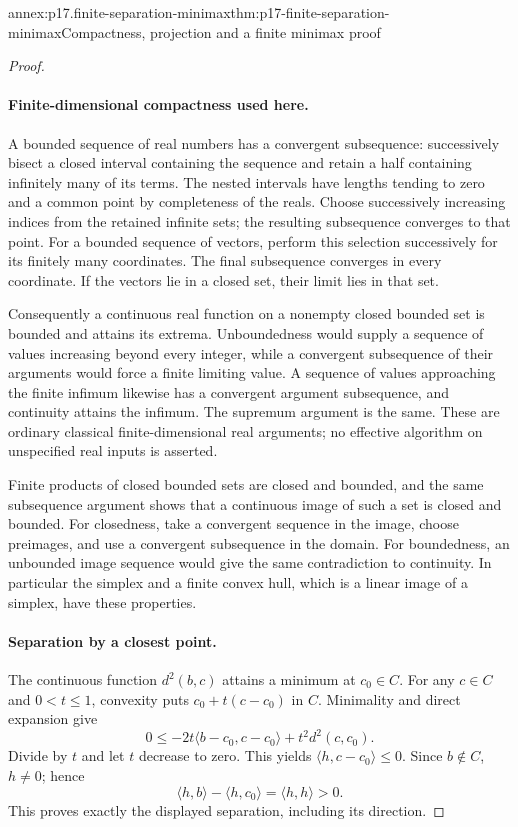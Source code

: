 \begin{annexitem}{annex:p17.finite-separation-minimax}{thm:p17-finite-separation-minimax}{Compactness, projection and a finite minimax proof}
\begin{proof}
\paragraph{Finite-dimensional compactness used here.}
A bounded sequence of real numbers has a convergent subsequence:
successively bisect a closed interval containing the sequence and retain
a half containing infinitely many of its terms. The nested intervals
have lengths tending to zero and a common point by completeness of the
reals. Choose successively increasing indices from the retained infinite
sets; the resulting subsequence converges to that point.
For a bounded sequence of vectors, perform this selection successively
for its finitely many coordinates. The final subsequence converges in
every coordinate. If the vectors lie in a closed set, their limit lies
in that set.

Consequently a continuous real function on a nonempty closed bounded
set is bounded and attains its extrema. Unboundedness would supply a
sequence of values increasing beyond every integer, while a convergent
subsequence of their arguments would force a finite limiting value.
A sequence of values approaching the finite infimum likewise has a
convergent argument subsequence, and continuity attains the infimum.
The supremum argument is the same. These are ordinary classical
finite-dimensional real arguments; no effective algorithm on unspecified
real inputs is asserted.

Finite products of closed bounded sets are closed and bounded, and the
same subsequence argument shows that a continuous image of such a set
is closed and bounded. For closedness, take a convergent sequence in
the image, choose preimages, and use a convergent subsequence in the
domain. For boundedness, an unbounded image sequence would give the
same contradiction to continuity. In particular the simplex and a
finite convex hull, which is a linear image of a simplex, have these
properties.

\paragraph{Separation by a closest point.}
The continuous function \(d^2(b,c)\) attains a minimum at \(c_0\in C\).
For any \(c\in C\) and \(0<t\leq1\), convexity puts
\(c_0+t(c-c_0)\) in \(C\). Minimality and direct expansion give
\[
 0\leq -2t\langle b-c_0,c-c_0\rangle+t^2d^2(c,c_0).
\]
Divide by \(t\) and let \(t\) decrease to zero. This yields
\(\langle h,c-c_0\rangle\leq0\).
Since \(b\notin C\), \(h\ne0\); hence
\[
 \langle h,b\rangle-\langle h,c_0\rangle
       =\langle h,h\rangle>0.
\]
This proves exactly the displayed separation, including its direction.


\end{proof}
\end{annexitem}
